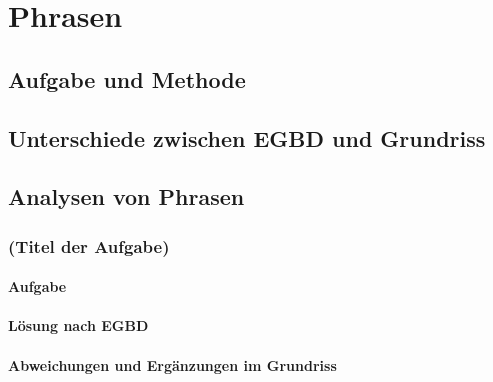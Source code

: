 \chapter{Phrasen}
\label{sec:phrasen}

\section{Aufgabe und Methode}
\label{sec:phrasen:aufgabeundmethoden}

\section{Unterschiede zwischen EGBD und Grundriss}
\label{sec:phrasen:unterschiedezwischenegbdundgrundriss}

\section{Analysen von Phrasen}
\label{sec:phrasen:analysen von Phrasen}

\subsection{(Titel der Aufgabe)}

\subsubsection{Aufgabe}

\subsubsection{Lösung nach EGBD}

\subsubsection{Abweichungen und Ergänzungen im Grundriss}


